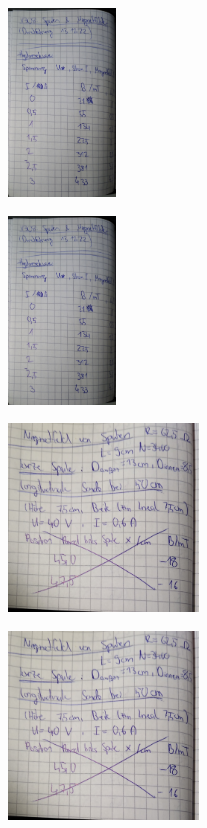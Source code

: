 \begin{minipage}[t]{0.4\textwidth}
    \includegraphics[height=5cm, page=8]{scans_messdaten/v308_Hysteresekurve.pdf}
\end{minipage}
\begin{minipage}[t]{0.4\textwidth}
    \includegraphics[height=5cm, page=9]{scans_messdaten/v308_Hysteresekurve.pdf}
\end{minipage}


\begin{minipage}[t]{0.4\textwidth}
    \includegraphics[height=5cm, page=1]{scans_messdaten/v308_lange_kurze_Spule.pdf}
\end{minipage}
\begin{minipage}[t]{0.4\textwidth}
    \includegraphics[height=5cm, keepaspectratio, page=2]{scans_messdaten/v308_lange_kurze_Spule.pdf}
\end{minipage}

